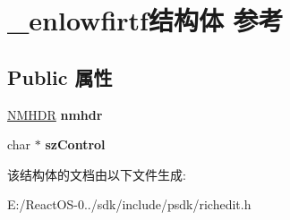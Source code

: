 \hypertarget{struct__enlowfirtf}{}\section{\+\_\+enlowfirtf结构体 参考}
\label{struct__enlowfirtf}
\subsection*{Public 属性}
\begin{DoxyCompactItemize}
\item 
\mbox{\label{struct__enlowfirtf_a5f61a5f690391b1d73028e73c86e9182}} 
\hyperlink{structtag_n_m_h_d_r}{N\+M\+H\+DR} {\bfseries nmhdr}
\item 
\mbox{\label{struct__enlowfirtf_a6696ef139a4430b2ed243540ef1b1a50}} 
char $\ast$ {\bfseries sz\+Control}
\end{DoxyCompactItemize}


该结构体的文档由以下文件生成\+:\begin{DoxyCompactItemize}
\item 
E\+:/\+React\+O\+S-\/0../sdk/include/psdk/richedit.\+h\end{DoxyCompactItemize}
